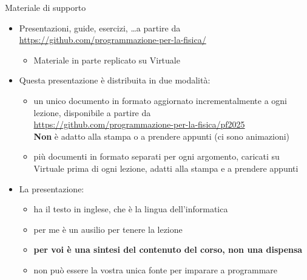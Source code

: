 \begin{frame}{Materiale di supporto}

  \begin{itemize}[<+->]

  \item Presentazioni, guide, esercizi, \ldots a partire da
    \url{https://github.com/programmazione-per-la-fisica/}
    \begin{itemize}[<.->]
    \item Materiale in parte replicato su Virtuale
    \end{itemize}

  \item Questa presentazione è distribuita in due modalità:
    \begin{itemize}[<.->]
    \item un unico documento in formato  aggiornato incrementalmente a
      ogni lezione, disponibile a partire da\\
      {\smaller \url{https://github.com/programmazione-per-la-fisica/pf2025}}\\
      \textbf{Non} è adatto alla stampa o a prendere appunti (ci sono
      animazioni)
    \item più documenti in formato  separati per ogni argomento,
      caricati su Virtuale prima di ogni lezione, adatti alla stampa e a
      prendere appunti
    \end{itemize}

  \item La presentazione:
    \begin{itemize}[<.->]
    \item ha il testo in inglese, che è la lingua dell'informatica
    \item per me è un ausilio per tenere la lezione
    \item \textbf{per voi è una sintesi del contenuto del corso, non una dispensa}
    \item non può essere la vostra unica fonte per imparare a programmare
    \end{itemize}

  \end{itemize}

\end{frame}

